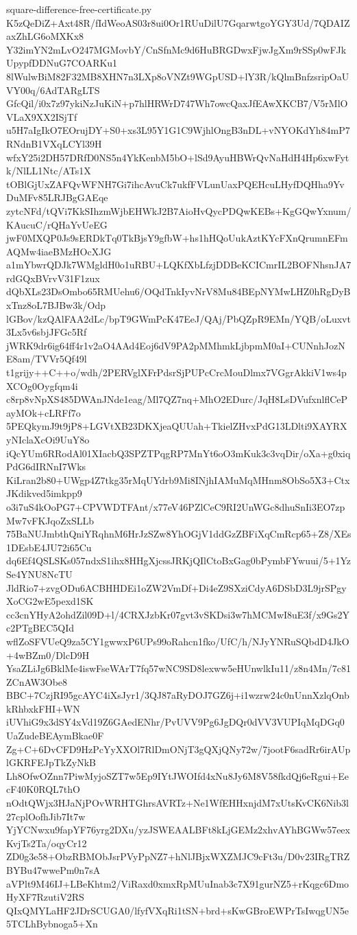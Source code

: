 \documentclass[11pt]{article}
\theoremstyle{definition}
\theoremstyle{remark}
\begin{document}
\begin{filecontents*}[overwrite]{square-difference-free-certificate.py}
K5zQeDiZ+Axt48R/fIdWeoAS03r8ui0Or1RUuDilU7GqarwtgoYGY3Ud/7QDAIZaxZhLG6oMXKx8
Y32imYN2mLvO247MGMovbY/CnSfnMc9d6HuBRGDwxFjwJgXm9rSSp0wFJkUpypfDDNuG7COARKu1
8lWulwBiM82F32MB8XHN7n3LXp8oVNZt9WGpUSD+lY3R/kQlmBnfzsripOaUVY00q/6AdTARgLTS
GfcQil/i0x7z97ykiNzJuKiN+p7hlHRWrD747Wh7owcQaxJfEAwXKCB7/V5rMlOVLaX9XX2ISjTf
u5H7aIgIkO7EOrujDY+S0+xs3L95Y1G1C9WjhlOngB3nDL+vNYOKdYh84mP7RNdnB1VXqLCYl39H
wfxY25i2DH57DRfD0NS5n4YkKenbM5bO+lSd9AyuHBWrQvNaHdH4Hp6xwFytk/NlLL1Ntc/ATs1X
tOBlGjUxZAFQvWFNH7Gi7ihcAvuCk7ukfFVLunUaxPQEHcuLHyfDQHha9YvDuMFv85LRJBgGAEqe
zytcNFd/tQVi7KkSIhzmWjbEHWkJ2B7AioHvQycPDQwKEBs+KgGQwYxnum/KAucuC/rQHaYvUeEG
jwF0MXQP0Js9sERDkTq0TkBjsY9gfbW+hs1hHQoUukAztKYcFXnQrumnEFmAQMw4iaeBMzHOcXJG
a1mYbwrQDJk7WMgldH0o1uRBU+LQKfXbLfzjDDBeKCICmrIL2BOFNhsnJA7rdGQxBVrvV31F1zux
dQbXLs23DsOmbo65RMUehu6/OQdTnkIyvNrV8Mu84BEpNYMwLHZ0hRgDyBxTnz8oL7BJBw3k/Odp
lGBov/kzQAlFAA2dLc/bpT9GWmPcK47EeJ/QAj/PbQZpR9EMn/YQB/oLuxvt3Lx5v6sbjJFGc5Rf
jWRK9dr6ig64ff4r1v2aO4AAd4Eoj6dV9PA2pMMhmkLjbpmM0aI+CUNnhJozNE8am/TVVr5Qf49l
t1grijy++C++o/wdh/2PERVglXFrPdsrSjPUPcCrcMouDlmx7VGgrAkkiV1ws4pXCOg0Oygfqm4i
c8rp8vNpXS485DWAnJNde1eag/Ml7QZ7nq+MhO2EDurc/JqH8LsDVufxnlflCePayMOk+cLRFf7o
5PEQkymJ9t9jP8+LGVtXB23DKXjeaQUUah+TkielZHvxPdG13LDlti9XAYRXyNIclaXcOi9UuY8o
iQcYUm6RRodAl01XIacbQ3SPZTPqgRP7MnYt6oO3mKuk3c3vqDir/oXa+g0xiqPdG6dIRNnI7Wks
KiLran2b80+UWgp4Z7tkg35rMqUYdrb9Mi8INjhIAMuMqMHnm8ObSo5X3+CtxJKdikved5imkpp9
o3i7uS4kOoPG7+CPVWDTFAnt/x77eV46PZlCeC9RI2UnWGc8dhuSnIi3EO7zpMw7vFKJqoZxSLLb
75BaNUJmbthQniYRqhnM6HrJzSZw8YhOGjV1ddGzZBFiXqCmRcp65+Z8/XEs1DEsbE4JU72i65Cu
dq6Ef4QSLSKs057ndxS1ihx8HHgXjcssJRKjQIlCtoBxGag0bPymbFYwuui/5+1YzSe4YNU8NcTU
JldRio7+zvgODu6ACBHHDEi1oZW2VmDf+Di4eZ9SXziCdyA6DSbD3L9jrSPgyXoCG2wE5pexd1SK
cc3cnYHyA2ohdZil09D+l/4CRXJzbKr07gvt3vSKDsi3w7hMCMwI8uE3f/x9Gs2Yc2PTgBEC5QId
wflZoSFVUeQ9za5CY1gwwxP6UPs99oRahcn1fko/UfC/h/NJyYNRuSQbdD4JkO+4wBZm0/DlcD9H
YsaZLiJg6BklMe4iswFseWArT7fq57wNC9SD8lexww5eHUnwlkIu11/z8n4Mn/7c81ZCnAW3Obe8
BBC+7CzjRI95gcAYC4iXsJyr1/3QJ87aRyDOJ7GZ6j+i1wzrw24c0nUnnXzlqOnbkRhbxkFHI+WN
iUVhiG9x3dSY4xVd19Z6GAedENhr/PvUVV9Pg6JgDQr0dVV3VUPIqMqDGq0UaZudeBEAymBkae0F
Zg+C+6DvCFD9HzPcYyXXOl7RlDmONjT3gQXjQNy72w/7jootF6sadRr6irAUplGKRFEJpTkZyNkB
Lh8OfwOZnn7PiwMyjoSZT7w5Ep9IYtJWOIfd4xNu8Jy6M8V58fkdQj6eRgui+EecF40K0RQL7thO
nOdtQWjx3HJaNjPOvWRHTGhrsAVRTz+Ne1WfEHHxnjdM7xUtsKvCK6Nib3l27cplOofhJib7It7w
YjYCNwxu9fapYF76yrg2DXu/yzJSWEAALBFt8kLjGEMz2xhvAYhBGWw57eexKvjTs2Ta/oqyCr12
ZD0g3e58+ObzRBMObJsrPVyPpNZ7+hNlJBjxWXZMJC9cFt3u/D0v23IRgTRZBYBu47wwePm0n7sA
aVPlt9M46IJ+LBeKhtm2/ViRaxd0xmxRpMUuInab3c7X91gurNZ5+rKqgc6DmoHyXF7RzutiV2RS
QIxQMYLaHF2JDrSCUGA0/lfyfVXqRi1tSN+brd+sKwGBroEWPrTsIwqgUN5e5TCLhBybnoga5+Xn

\end{filecontents*}
\end{document}
